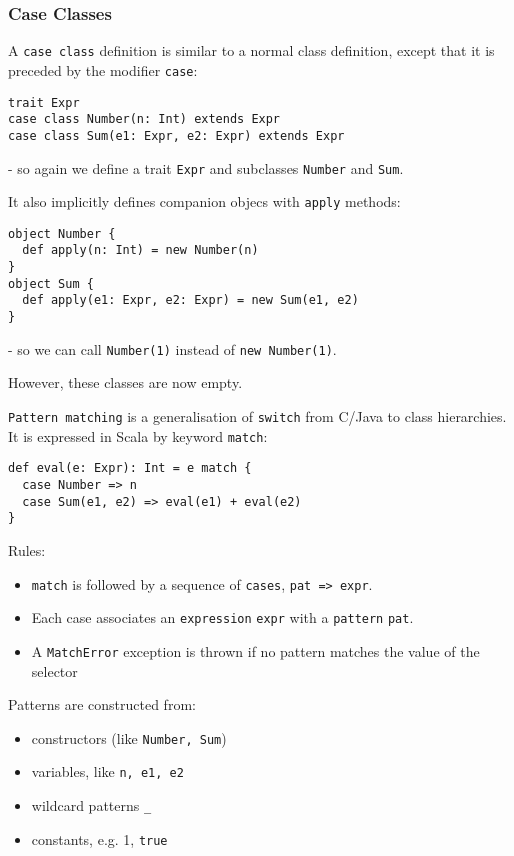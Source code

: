 \documentclass{scrartcl}
\newcommand{\term}[1]{\verb~#1~} %
\begin{document}
\subsubsection{Case Classes}
\label{sec:CaseClasses}

A \term{case class} definition is similar to a normal class definition, except
that it is preceded by the modifier \lstinline|case|:
\begin{lstlisting}
trait Expr
case class Number(n: Int) extends Expr
case class Sum(e1: Expr, e2: Expr) extends Expr
\end{lstlisting}
- so again we define a trait \lstinline|Expr| and subclasses \lstinline|Number|
and \lstinline|Sum|.

It also implicitly defines companion objecs with \lstinline|apply| methods:
\begin{lstlisting}
object Number {
  def apply(n: Int) = new Number(n)
}
object Sum {
  def apply(e1: Expr, e2: Expr) = new Sum(e1, e2)
}
\end{lstlisting}
- so we can call \lstinline|Number(1)| instead of \lstinline|new Number(1)|.

However, these classes are now empty. 

\term{Pattern matching} is a generalisation of \lstinline|switch| from C/Java to
class hierarchies. It is expressed in Scala by keyword \lstinline|match|:
\begin{lstlisting}
def eval(e: Expr): Int = e match {
  case Number => n
  case Sum(e1, e2) => eval(e1) + eval(e2)
}
\end{lstlisting}
Rules:
\begin{itemize}
\item \lstinline|match| is followed by a sequence of \lstinline|cases|,
  \lstinline|pat => expr|.
\item Each case associates an \term{expression} \lstinline|expr| with a
  \term{pattern} \lstinline|pat|.
\item A \lstinline|MatchError| exception is thrown if no pattern matches the
  value of the selector
\end{itemize}
Patterns are constructed from:
\begin{itemize}
\item constructors (like \lstinline|Number, Sum|)
\item variables, like \lstinline|n, e1, e2|
\item wildcard patterns \lstinline|_|
\item constants, e.g. 1, \lstinline|true|
\end{itemize}
\end{document}
